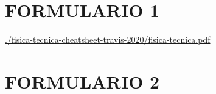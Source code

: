 \section{FORMULARIO 1}
\url{./fisica-tecnica-cheatsheet-travis-2020/fisica-tecnica.pdf}
\section{FORMULARIO 2}